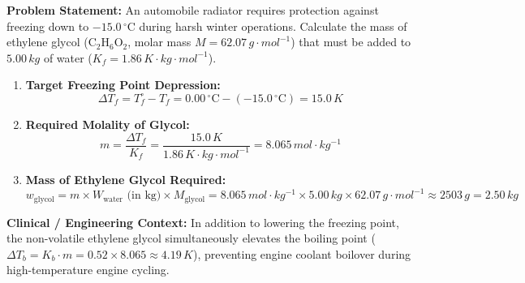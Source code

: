 \documentclass[10pt,a4paper]{article}
\begin{document}
\begin{usecasebox}
\textbf{Problem Statement:} An automobile radiator requires protection against freezing down to $-15.0\,^\circ\mathrm{C}$ during harsh winter operations. Calculate the mass of ethylene glycol ($\mathrm{C_2H_6O_2}$, molar mass $M = 62.07\,\si{g\cdot mol^{-1}}$) that must be added to $5.00\,\si{kg}$ of water ($K_f = 1.86\,\si{K\cdot kg\cdot mol^{-1}}$).
\begin{enumerate}
  \item \textbf{Target Freezing Point Depression:}
  \begin{equation*}
    \Delta T_f = T_f^\circ - T_f = 0.00\,^\circ\mathrm{C} - (-15.0\,^\circ\mathrm{C}) = 15.0\,\si{K}
  \end{equation*}
  \item \textbf{Required Molality of Glycol:}
  \begin{equation*}
    m = \frac{\Delta T_f}{K_f} = \frac{15.0\,\si{K}}{1.86\,\si{K\cdot kg\cdot mol^{-1}}} = 8.065\,\si{mol\cdot kg^{-1}}
  \end{equation*}
  \item \textbf{Mass of Ethylene Glycol Required:}
  \begin{equation*}
    w_{\mathrm{glycol}} = m \times W_{\mathrm{water}}\text{ (in kg)} \times M_{\mathrm{glycol}} = 8.065\,\si{mol\cdot kg^{-1}} \times 5.00\,\si{kg} \times 62.07\,\si{g\cdot mol^{-1}} \approx 2503\,\si{g} = 2.50\,\si{kg}
  \end{equation*}
\end{enumerate}
\textbf{Clinical / Engineering Context:} In addition to lowering the freezing point, the non-volatile ethylene glycol simultaneously elevates the boiling point ($\Delta T_b = K_b \cdot m = 0.52 \times 8.065 \approx 4.19\,\si{K}$), preventing engine coolant boilover during high-temperature engine cycling.
\end{usecasebox}
\end{document}
